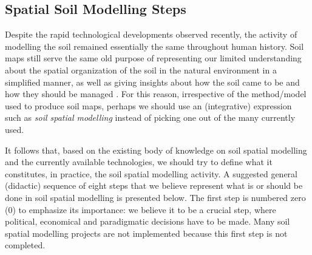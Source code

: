 \subsection{Spatial Soil Modelling Steps}

Despite the rapid technological developments observed recently, the activity of modelling the soil remained 
essentially the same throughout human history. Soil maps still serve the same old purpose of representing our 
limited understanding about the spatial organization of the soil in the natural environment in a simplified 
manner, as well as giving insights about how the soil came to be and how they should be managed 
\cite{Jenny1941, Hudson1992, Legros2006, Blanco-CanquiEtAl2010, Grunwald2010}. For this reason, irrespective 
of the method/model used to produce soil maps, perhaps we should use an (integrative) expression such as 
\emph{soil spatial modelling} instead of picking one out of the many currently used.

It follows that, based on the existing body of knowledge on soil spatial modelling and the currently available 
technologies, we should try to define what it constitutes, in practice, the soil spatial modelling activity. A 
suggested general (didactic) sequence of eight steps that we believe represent what is or should be done in 
soil spatial modelling is presented below. The first step is numbered zero (0) to emphasize its importance: we
believe it to be a crucial step, where political, economical and paradigmatic decisions have to be made. Many
soil spatial modelling projects are not implemented because this first step is not completed.

